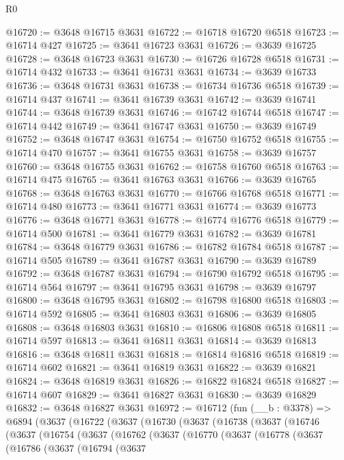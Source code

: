 \begin{lexlean}{R0}
\begin{coremodule}
@16720 := @3648 @16715 @3631
@16722 := @16718 @16720 @6518
@16723 := @16714 @427
@16725 := @3641 @16723 @3631
@16726 := @3639 @16725
@16728 := @3648 @16723 @3631
@16730 := @16726 @16728 @6518
@16731 := @16714 @432
@16733 := @3641 @16731 @3631
@16734 := @3639 @16733
@16736 := @3648 @16731 @3631
@16738 := @16734 @16736 @6518
@16739 := @16714 @437
@16741 := @3641 @16739 @3631
@16742 := @3639 @16741
@16744 := @3648 @16739 @3631
@16746 := @16742 @16744 @6518
@16747 := @16714 @442
@16749 := @3641 @16747 @3631
@16750 := @3639 @16749
@16752 := @3648 @16747 @3631
@16754 := @16750 @16752 @6518
@16755 := @16714 @470
@16757 := @3641 @16755 @3631
@16758 := @3639 @16757
@16760 := @3648 @16755 @3631
@16762 := @16758 @16760 @6518
@16763 := @16714 @475
@16765 := @3641 @16763 @3631
@16766 := @3639 @16765
@16768 := @3648 @16763 @3631
@16770 := @16766 @16768 @6518
@16771 := @16714 @480
@16773 := @3641 @16771 @3631
@16774 := @3639 @16773
@16776 := @3648 @16771 @3631
@16778 := @16774 @16776 @6518
@16779 := @16714 @500
@16781 := @3641 @16779 @3631
@16782 := @3639 @16781
@16784 := @3648 @16779 @3631
@16786 := @16782 @16784 @6518
@16787 := @16714 @505
@16789 := @3641 @16787 @3631
@16790 := @3639 @16789
@16792 := @3648 @16787 @3631
@16794 := @16790 @16792 @6518
@16795 := @16714 @564
@16797 := @3641 @16795 @3631
@16798 := @3639 @16797
@16800 := @3648 @16795 @3631
@16802 := @16798 @16800 @6518
@16803 := @16714 @592
@16805 := @3641 @16803 @3631
@16806 := @3639 @16805
@16808 := @3648 @16803 @3631
@16810 := @16806 @16808 @6518
@16811 := @16714 @597
@16813 := @3641 @16811 @3631
@16814 := @3639 @16813
@16816 := @3648 @16811 @3631
@16818 := @16814 @16816 @6518
@16819 := @16714 @602
@16821 := @3641 @16819 @3631
@16822 := @3639 @16821
@16824 := @3648 @16819 @3631
@16826 := @16822 @16824 @6518
@16827 := @16714 @607
@16829 := @3641 @16827 @3631
@16830 := @3639 @16829
@16832 := @3648 @16827 @3631
@16972 := @16712
    (fun (__b : @3378) =>
    @6894
      (@3637
        (@16722
          (@3637
            (@16730
              (@3637
                (@16738
                  (@3637
                    (@16746
                      (@3637
                        (@16754
                          (@3637
                            (@16762
                              (@3637
                                (@16770
                                  (@3637
                                    (@16778
                                      (@3637
                                        (@16786
                                          (@3637
                                            (@16794
                                              (@3637

\end{coremodule}
\end{lexlean}
